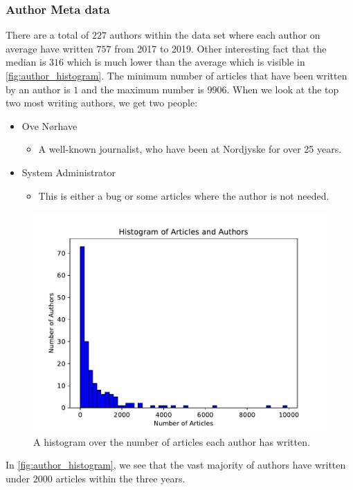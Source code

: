 \subsubsection{Author Meta data}
There are a total of $227$ authors within the data set where each author on average have written $757$ from 2017 to 2019.
Other interesting fact that the median is $316$ which is much lower than the average which is visible in \autoref{fig:author_histogram}.
The minimum number of articles that have been written by an author is $1$ and the maximum number is $9906$.
When we look at the top two most writing authors, we get two people:
\begin{itemize}
	\item Ove Nørhave
	\begin{itemize}
		\item A well-known journalist, who have been at Nordjyske for over 25 years.
	\end{itemize}
	\item System Administrator
	\begin{itemize}
		\item This is either a bug or some articles where the author is not needed.
	\end{itemize}
\end{itemize}

 
\begin{figure}
	\centering
	\includegraphics[width=\linewidth]{figures/author_hist_plot.pdf}
	\caption{A histogram over the number of articles each author has written.}
	\label{fig:author_histogram}
\end{figure}
In \autoref{fig:author_histogram}, we see that the vast majority of authors have written under $2000$ articles within the three years. 
